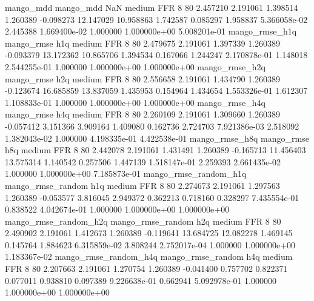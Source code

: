             mango_mdd         mango_mdd                  NaN     medium      FFR                 8 80  2.457210       2.191061 1.398514       1.260389   -0.098273     12.147029     10.958863     1.742587       0.085297  1.958837 5.366058e-02     2.445388   1.669400e-02            1.000000    1.000000e+00        5.008201e-01
       mango_rmse_h1q        mango_rmse                  h1q     medium      FFR                 8 80  2.479675       2.191061 1.397339       1.260389   -0.093379     13.172362     10.865706     1.394534       0.167066  1.244247 2.170878e-01     1.148018   2.544255e-01            1.000000    1.000000e+00        1.000000e+00
       mango_rmse_h2q        mango_rmse                  h2q     medium      FFR                 8 80  2.556658       2.191061 1.434790       1.260389   -0.123674     16.685859     13.837059     1.435953       0.154964  1.434654 1.553326e-01     1.612307   1.108833e-01            1.000000    1.000000e+00        1.000000e+00
       mango_rmse_h4q        mango_rmse                  h4q     medium      FFR                 8 80  2.260109       2.191061 1.309660       1.260389   -0.057412      3.151366      3.909164     1.409080       0.162736  2.724703 7.921386e-03     2.518092   1.382043e-02            1.000000    4.198335e-01        4.422538e-01
       mango_rmse_h8q        mango_rmse                  h8q     medium      FFR                 8 80  2.442078       2.191061 1.431491       1.260389   -0.165713     11.456403     13.575314     1.140542       0.257506  1.447139 1.518147e-01     2.259393   2.661435e-02            1.000000    1.000000e+00        7.185873e-01
mango_rmse_random_h1q mango_rmse_random                  h1q     medium      FFR                 8 80  2.274673       2.191061 1.297563       1.260389   -0.053577      3.816045      2.949372     0.362213       0.718160  0.328297 7.435554e-01     0.838522   4.042674e-01            1.000000    1.000000e+00        1.000000e+00
mango_rmse_random_h2q mango_rmse_random                  h2q     medium      FFR                 8 80  2.490902       2.191061 1.412673       1.260389   -0.119641     13.684725     12.082278     1.469145       0.145764  1.884623 6.315859e-02     3.808244   2.752017e-04            1.000000    1.000000e+00        1.183367e-02
mango_rmse_random_h4q mango_rmse_random                  h4q     medium      FFR                 8 80  2.207663       2.191061 1.270754       1.260389   -0.041400      0.757702      0.822371     0.077011       0.938810  0.097389 9.226638e-01     0.662941   5.092978e-01            1.000000    1.000000e+00        1.000000e+00
